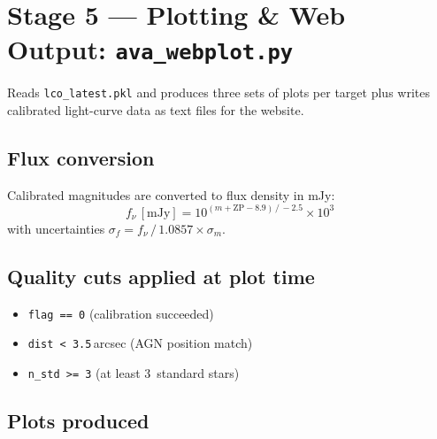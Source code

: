\documentclass[12pt,a4paper]{article}
\begin{document}
\section{Stage 5 --- Plotting \& Web Output: \texorpdfstring{\texttt{ava\_webplot.py}}{ava_webplot.py}}
\label{sec:webplot}

Reads \texttt{lco\_latest.pkl} and produces three sets of plots per target plus writes
calibrated light-curve data as text files for the website.

\subsection{Flux conversion}

Calibrated magnitudes are converted to flux density in mJy:
\begin{equation}
  f_\nu \,[\text{mJy}] = 10^{(m + \mathrm{ZP} - 8.9)\,/\,-2.5} \times 10^3
  \label{eq:flux}
\end{equation}
with uncertainties $\sigma_f = f_\nu \,/\, 1.0857 \times \sigma_m$.

\subsection{Quality cuts applied at plot time}

\begin{itemize}[noitemsep]
  \item \texttt{flag == 0} (calibration succeeded)
  \item \texttt{dist < 3.5}\,arcsec (AGN position match)
  \item \texttt{n\_std >= 3} (at least 3~standard stars)
\end{itemize}

\subsection{Plots produced}
\end{document}

